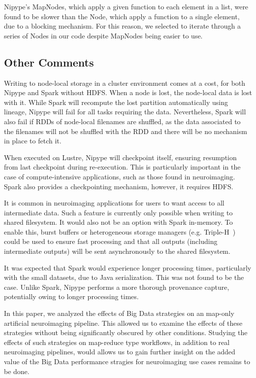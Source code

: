Nipype's MapNodes, which apply a given function to each element in 
a list, were found to be slower than the Node, which apply a function 
to a single element, due to a blocking mechanism. For this reason, we 
selected to iterate through a series of Nodes in our code despite MapNodes being
easier to use.


\subsection{Other Comments}

Writing to node-local storage in a cluster environment comes at a cost, for both
Nipype and Spark without HDFS. When a node is lost, the node-local data is lost
with it. While Spark will recompute the lost partition automatically using lineage, 
Nipype will fail for all tasks requiring the data. Nevertheless, Spark will also fail if 
RDDs of node-local filenames are shuffled, as the data associated to the filenames
will not be shuffled with the RDD and there will be no mechanism in place to fetch it.

When executed on Lustre, Nipype will checkpoint itself, ensuring resumption from
last checkpoint during re-execution. This is particularly important in the case of compute-intensive 
applications, such as those found in neuroimaging. Spark also provides a checkpointing
mechanism, however, it requires HDFS.

It is common in neuroimaging applications for users to want access to all intermediate
data. Such a feature is currently only possible when writing to shared filesystem. 
It would also not be an option with Spark in-memory. To enable this, burst buffers or 
heterogeneous storage managers (e.g. Triple-H~\cite{islam2015triple}) could be used to ensure
fast processing and that all outputs (including intermediate outputs) will be 
sent asynchronously to the shared filesystem.

It was expected that Spark would experience longer processing times, particularly
with the small datasets, due to Java serialization. This was not found to be the case. 
Unlike Spark, Nipype performs a more thorough provenance capture, potentially owing to longer
processing times.

In this paper, we analyzed the effects of Big Data strategies on an map-only artificial
neuroimaging pipeline. This allowed us to examine the effects of these strategies
without being significantly obscured by other conditions. Studying the effects 
of such strategies on map-reduce type
workflows, in addition to real neuroimaging pipelines, would allows us to gain
further insight on the added
value of the Big Data performance stragies for neuroimaging use cases remains to be
done.

